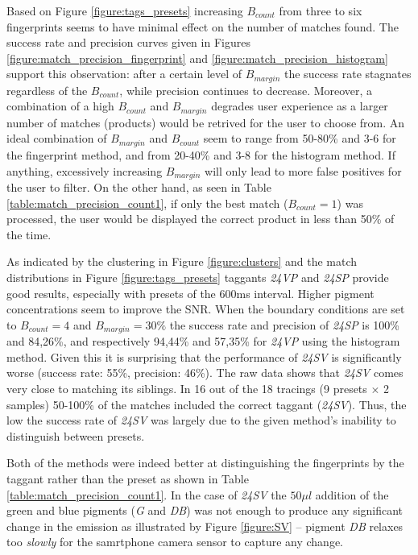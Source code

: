 \documentclass[thesis.tex]{subfiles}
\begin{document}
Based on Figure \ref{figure:tags_presets} increasing $B_{count}$ from three to six fingerprints seems to have minimal effect on the number of matches found. The success rate and precision curves given in Figures \ref{figure:match_precision_fingerprint} and \ref{figure:match_precision_histogram} support this observation: after a certain level of $B_{margin}$ the success rate stagnates regardless of the $B_{count}$, while precision continues to decrease. Moreover, a combination of a high $B_{count}$ and $B_{margin}$ degrades user experience as a larger number of matches (products) would be retrived for the user to choose from. An ideal combination of $B_{margin}$ and $B_{count}$ seem to range from 50-80\% and 3-6 for the fingerprint method, and from 20-40\% and 3-8 for the histogram method. If anything, excessively increasing $B_{margin}$ will only lead to more false positives for the user to filter. On the other hand, as seen in Table \ref{table:match_precision_count1}, if only the best match ($B_{count} = 1$) was processed, the user would be displayed the correct product in less than 50\% of the time.

As indicated by the clustering in Figure \ref{figure:clusters} and the match distributions in Figure \ref{figure:tags_presets} taggants \emph{24VP} and \emph{24SP} provide good results, especially with presets of the 600ms interval. Higher pigment concentrations seem to improve the SNR. When the boundary conditions are set to $B_{count} = 4$ and $B_{margin} = 30\%$ the success rate and precision of \emph{24SP} is 100\% and 84,26\%, and respectively 94,44\% and 57,35\% for \emph{24VP} using the histogram method. Given this it is surprising that the performance of \emph{24SV} is significantly worse (success rate: 55\%, precision: 46\%). The raw data shows that \emph{24SV} comes very close to matching its siblings. In 16 out of the 18 tracings (9 presets $\times$ 2 samples) 50-100\% of the matches included the correct taggant (\emph{24SV}). Thus, the low the success rate of \emph{24SV} was largely due to the given method's inability to distinguish between presets.

Both of the methods were indeed better at distinguishing the fingerprints by the taggant rather than the preset as shown in Table \ref{table:match_precision_count1}. In the case of \emph{24SV} the $50\mu l$ addition of the green and blue pigments (\emph{G} and \emph{DB}) was not enough to produce any significant change in the emission as illustrated by Figure \ref{figure:SV} -- pigment \emph{DB} relaxes too \emph{slowly} for the samrtphone camera sensor to capture any change.
\end{document}
